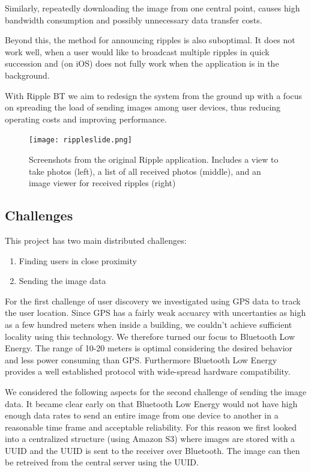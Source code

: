 \documentclass{report}
\newcommand{\lfig}[1]{\label{fig:#1}}
\begin{document}
Similarly, repeatedly downloading the image from one central point, causes high bandwidth consumption and possibly unnecessary data transfer costs.

Beyond this, the method for announcing ripples is also suboptimal. It does not work well, when a user would like to broadcast multiple ripples in quick succession and (on iOS) does not fully work when the application is in the background.

With Ripple BT we aim to redesign the system from the ground up with a focus on spreading the load of sending images among user devices, thus reducing operating costs and improving performance.

\begin{figure}[h]
	\centering
    \texttt{[image: rippleslide.png]}
    \lfig{example}
    \vspace{-5mm} %
	\caption{Screenshots from the original Ripple application. Includes a view to take photos (left), a list of all received photos (middle), and an image viewer for received ripples (right)}
\end{figure}

\subsection{Challenges}
This project has two main distributed challenges:
\begin{enumerate} 
    \item Finding users in close proximity
    \item Sending the image data
\end{enumerate}

For the first challenge of user discovery we investigated using GPS data to track the user location. Since GPS has a fairly weak accuarcy with uncertanties as high as a few hundred meters when inside a building, we couldn't achieve sufficient locality using this technology. We therefore turned our focus to Bluetooth Low Energy. The range of 10-20 meters is optimal considering the desired behavior and less power consuming than GPS. Furthermore Bluetooth Low Energy provides a well established protocol with wide-spread hardware compatibility.

We considered the following aspects for the second challenge of sending the image data.
It became clear early on that Bluetooth Low Energy would not have high enough data rates to send an entire image from one device to another in a reasonable time frame and acceptable reliability. For this reason we first looked into a centralized structure (using Amazon S3) where images are stored with a UUID and the UUID is sent to the receiver over Bluetooth. The image can then be retreived from the central server using the UUID.
\end{document}
